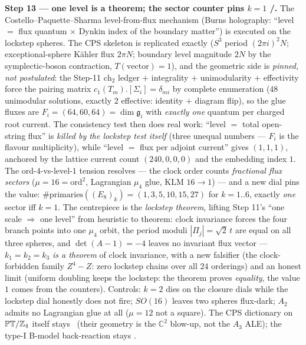 \par\smallskip\noindent\textbf{Step 13 --- one level is a theorem; the sector counter pins $k=1$
\mE/\mC.} The Costello--Paquette--Sharma level-from-flux mechanism (Burns holography: ``level $=$
flux quantum $\times$ Dynkin index of the boundary matter'') is executed on the lockstep spheres.
The CPS skeleton is replicated exactly ($S^3$ period $(2\pi i)^2N$; exceptional-sphere K\"ahler
flux $2\pi N$; boundary level magnitude $2N$ by the symplectic-boson contraction, $T(\text{vector})=1$),
and the geometric side is \emph{pinned, not postulated}: the Step-11 $\mathrm{ch}_2$ ledger $+$
integrality $+$ unimodularity $+$ effectivity force the pairing matrix
$c_1(T_m).[\Sigma_i]=\delta_{mi}$ by complete enumeration ($48$ unimodular solutions, exactly $2$
effective: identity $+$ diagram flip), so the glue fluxes are $F_i=(64,60,64)=\dim\mathfrak g_i$
with \emph{exactly one} quantum per charged root current. The consistency test then does real
work: ``level $=$ total open-string flux'' is \emph{killed by the lockstep test itself} (three
unequal numbers --- $F_i$ is the flavour multiplicity), while ``level $=$ flux per adjoint
current'' gives $(1,1,1)$, anchored by the lattice current count $(240,0,0,0)$ and the embedding
index $1$. The ord-$4$-vs-level-$1$ tension resolves --- the clock order counts \emph{fractional
flux sectors} ($\mu=16=\mathrm{ord}^2$, Lagrangian $\mu_4$ glue, KLM $16\to1$) --- and a new dial
pins the value: $\#\mathrm{primaries}((E_8)_k)=(1,3,5,10,15,27)$ for $k=1..6$, exactly \emph{one}
sector iff $k=1$. The centrepiece is the \emph{lockstep theorem}, lifting Step 11's ``one scale
$\Rightarrow$ one level'' from heuristic to theorem: clock invariance forces the four branch
points into one $\mu_4$ orbit, the period moduli $|\Pi_j|=\sqrt2\,t$ are equal on all three
spheres, and $\det(A-1)=-4$ leaves no invariant flux vector --- $k_1=k_2=k_3$ \emph{is a theorem}
of clock invariance, with a new falsifier (the clock-forbidden family $Z^4{-}Z$: zero lockstep
chains over all $24$ orderings) and an honest limit (uniform doubling keeps the lockstep: the
theorem proves \emph{equality}, the value $1$ comes from the counters). Controls: $k=2$ dies on
the closure dials while the lockstep dial honestly does not fire; $SO(16)$ leaves two spheres
flux-dark; $A_2$ admits no Lagrangian glue at all ($\mu=12$ not a square). The CPS dictionary on
$\mathbb{PT}/\mathbb{Z}_4$ itself stays \mC\ (their geometry is the $\mathbb C^2$ blow-up, not the $A_3$
ALE); the type-I B-model back-reaction stays \mO.

